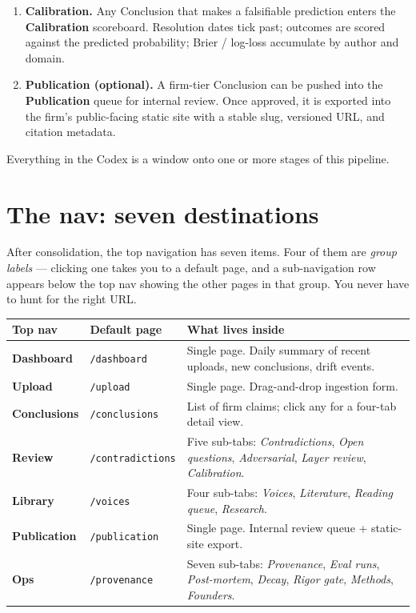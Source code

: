 \documentclass[11pt,letterpaper]{article}
\newcommand{\file}[1]{\texttt{#1}}
\newcommand{\page}[1]{\textbf{#1}}
\newcommand{\tab}[1]{\textsl{#1}}
\begin{document}
\begin{enumerate}[leftmargin=*,itemsep=0.3em]
  \item \textbf{Calibration.} Any Conclusion that makes a falsifiable prediction enters the \page{Calibration} scoreboard. Resolution dates tick past; outcomes are scored against the predicted probability; Brier / log-loss accumulate by author and domain.

  \item \textbf{Publication (optional).} A firm-tier Conclusion can be pushed into the \page{Publication} queue for internal review. Once approved, it is exported into the firm's public-facing static site with a stable slug, versioned URL, and citation metadata.
\end{enumerate}

Everything in the Codex is a window onto one or more stages of this pipeline.

\section{The nav: seven destinations}

After consolidation, the top navigation has seven items. Four of them are \emph{group labels} --- clicking one takes you to a default page, and a sub-navigation row appears below the top nav showing the other pages in that group. You never have to hunt for the right URL.

\begin{longtable}{@{}p{} p{} p{}@{}}
\toprule
\textbf{Top nav} & \textbf{Default page} & \textbf{What lives inside} \\
\midrule
\endhead
\page{Dashboard}   & \file{/dashboard}      & Single page. Daily summary of recent uploads, new conclusions, drift events. \\
\page{Upload}      & \file{/upload}         & Single page. Drag-and-drop ingestion form. \\
\page{Conclusions} & \file{/conclusions}    & List of firm claims; click any for a four-tab detail view. \\
\page{Review}      & \file{/contradictions} & Five sub-tabs: \tab{Contradictions}, \tab{Open questions}, \tab{Adversarial}, \tab{Layer review}, \tab{Calibration}. \\
\page{Library}     & \file{/voices}         & Four sub-tabs: \tab{Voices}, \tab{Literature}, \tab{Reading queue}, \tab{Research}. \\
\page{Publication} & \file{/publication}    & Single page. Internal review queue + static-site export. \\
\page{Ops}         & \file{/provenance}     & Seven sub-tabs: \tab{Provenance}, \tab{Eval runs}, \tab{Post-mortem}, \tab{Decay}, \tab{Rigor gate}, \tab{Methods}, \tab{Founders}. \\
\bottomrule
\end{longtable}
\end{document}
